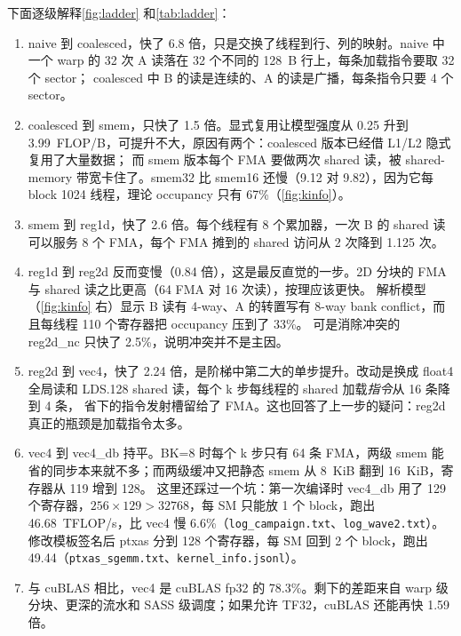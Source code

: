 \documentclass[11pt,a4paper]{ctexart}
\begin{document}
下面逐级解释\cref{fig:ladder} 和\cref{tab:ladder}：
\begin{enumerate}
  \item naive 到 coalesced，快了 6.8 倍，只是交换了线程到行、列的映射。naive 中一个 warp 的 32 次 A 读落在 32 个不同的 128~B 行上，每条加载指令要取 32 个 sector；
        coalesced 中 B 的读是连续的、A 的读是广播，每条指令只要 4 个 sector。
  \item coalesced 到 smem，只快了 1.5 倍。显式复用让模型强度从 0.25 升到 3.99~FLOP/B，可提升不大，原因有两个：coalesced 版本已经借 L1/L2 隐式复用了大量数据；
        而 smem 版本每个 FMA 要做两次 shared 读，被 shared-memory 带宽卡住了。smem32 比 smem16 还慢（9.12 对 9.82），因为它每 block 1024 线程，理论 occupancy 只有 67\%（\cref{fig:kinfo}）。
  \item smem 到 reg1d，快了 2.6 倍。每个线程有 8 个累加器，一次 B 的 shared 读可以服务 8 个 FMA，每个 FMA 摊到的 shared 访问从 2 次降到 1.125 次。
  \item reg1d 到 reg2d 反而变慢（0.84 倍），这是最反直觉的一步。2D 分块的 FMA 与 shared 读之比更高（64 FMA 对 16 次读），按理应该更快。
        解析模型（\cref{fig:kinfo} 右）显示 B 读有 4-way、A 的转置写有 8-way bank conflict，而且每线程 110 个寄存器把 occupancy 压到了 33\%。
        可是消除冲突的 reg2d\_nc 只快了 2.5\%，说明冲突并不是主因。
  \item reg2d 到 vec4，快了 2.24 倍，是阶梯中第二大的单步提升。改动是换成 float4 全局读和 LDS.128 shared 读，每个 k 步每线程的 shared 加载\emph{指令}从 16 条降到 4 条，
        省下的指令发射槽留给了 FMA。这也回答了上一步的疑问：reg2d 真正的瓶颈是加载指令太多。
  \item vec4 到 vec4\_db 持平。BK=8 时每个 k 步只有 64 条 FMA，两级 smem 能省的同步本来就不多；而两级缓冲又把静态 smem 从 8~KiB 翻到 16~KiB，寄存器从 119 增到 128。
        这里还踩过一个坑：第一次编译时 vec4\_db 用了 129 个寄存器，$256\times129>32768$，每 SM 只能放 1 个 block，跑出 46.68~TFLOP/s，比 vec4 慢 6.6\%（\texttt{log\_campaign.txt}、\texttt{log\_wave2.txt}）。
        修改模板签名后 ptxas 分到 128 个寄存器，每 SM 回到 2 个 block，跑出 49.44（\texttt{ptxas\_sgemm.txt}、\texttt{kernel\_info.jsonl}）。
  \item 与 cuBLAS 相比，vec4 是 cuBLAS fp32 的 78.3\%。剩下的差距来自 warp 级分块、更深的流水和 SASS 级调度；如果允许 TF32，cuBLAS 还能再快 1.59 倍。
\end{enumerate}
\end{document}
